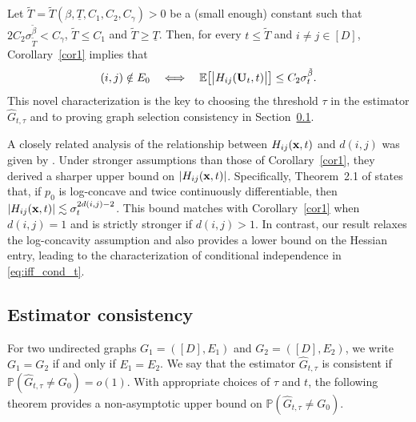 \documentclass[11pt,a4paper,final]{article}
\numberwithin{equation}{section}
\theoremstyle{remark}
\newcommand{\bU}{{\bf U}}
\newcommand{\bx}{{\bf x}}
\newcommand{\bbE}{{\mathbb E}}
\newcommand{\bbP}{{\mathbb P}}
\newcommand{\be}{\begin{equation}}
\newcommand{\ee}{\end{equation}}
\newcommand{\bean}{\setlength\arraycolsep{1pt}\begin{eqnarray*}}
\newcommand{\eean}{\end{eqnarray*}}
\begin{document}

Let $\widetilde {T} = {\widetilde T} (\beta, \underline{T}, C_{1}, C_{2}, C_{\gamma}) > 0$ be a (small enough) constant such that $2 C_{2} \sigma_{{\widetilde T}}^{\tilde \beta} < C_{\gamma}$, ${\widetilde T} \leq C_{1}$ and ${\widetilde T} \geq \underline{T}$.
Then, for every $t \leq {\widetilde T}$ and $i \neq j \in [D]$, Corollary~\ref{cor1} implies that
\be
(i,j) \notin E_{0}
\quad\Longleftrightarrow\quad
\bbE \big[ \big\vert H_{ij} (\bU_{t}, t) \big\vert \big] \leq C_{2} \sigma_{t}^{\tilde \beta}.
\label{eq:iff_cond_t}
\ee
This novel characterization is the key to choosing the threshold $\tau$ in the estimator $\widehat G_{t,\tau}$ and to proving graph selection consistency in Section~\ref{ssec:consistency}.

A closely related analysis of the relationship between $H_{ij}(\bx,t)$ and $d(i,j)$ was given by \cite{gottwald2025localized}.
Under stronger assumptions than those of Corollary~\ref{cor1}, they derived a sharper upper bound on $\vert H_{ij}(\bx,t) \vert$.
Specifically, Theorem~2.1 of \cite{gottwald2025localized} states that, if $p_{0}$ is log-concave and twice continuously differentiable, then $\vert H_{ij}(\bx,t) \vert \lesssim \sigma_{t}^{2d(i,j)-2}$.
This bound matches with Corollary~\ref{cor1} when $d(i,j) = 1$ and is strictly stronger if $d(i,j) > 1$.
In contrast, our result relaxes the log-concavity assumption and also provides a lower bound on the Hessian entry, leading to the characterization of conditional independence in \eqref{eq:iff_cond_t}.


\subsection{Estimator consistency}
\label{ssec:consistency}


For two undirected graphs $G_{1} = ([D],E_{1})$ and $G_{2} = ([D],E_{2})$, we write $G_{1} = G_{2}$ if and only if $E_{1} = E_{2}$.
We say that the estimator $\widehat G_{t,\tau}$ is consistent if 
$
\bbP ( \widehat G_{t,\tau} \neq G_{0} ) = o(1).
$
With appropriate choices of $\tau$ and $t$, the following theorem provides a non-asymptotic upper bound on $\bbP(\widehat G_{t,\tau} \neq G_{0})$.
\end{document}
